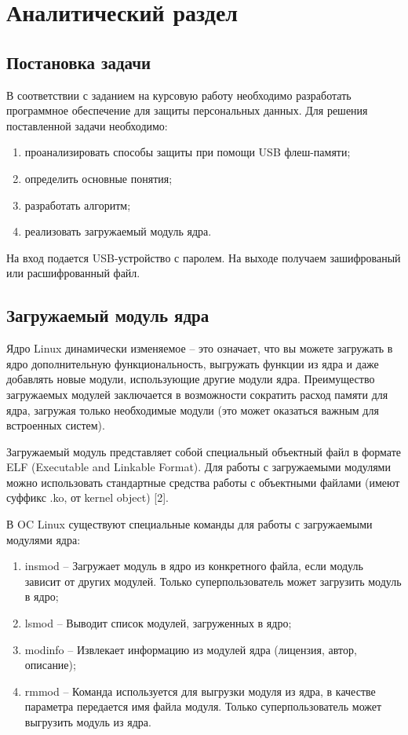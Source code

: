 \documentclass[a4paper, 10pt]{article}
\begin{document}
	
\clearpage
\newpage
\section{Аналитический раздел}
	\subsection{Постановка задачи}
	\hspace*{5mm} В соответствии с заданием на курсовую работу необходимо разработать программное обеспечение для защиты персональных данных. Для решения поставленной задачи необходимо:
	\begin{enumerate}
		\item проанализировать способы защиты при помощи USB флеш-памяти;
		\item определить основные понятия;
		\item разработать алгоритм;
		\item реализовать загружаемый модуль ядра.
	\end{enumerate}
	\hspace*{5mm} На вход подается USB-устройство с паролем. На выходе получаем зашифрованый или расшифрованный файл.
	
	\subsection{Загружаемый модуль ядра}
	\hspace*{5mm} Ядро Linux динамически изменяемое -- это означает, что вы можете загружать в ядро дополнительную функциональность, выгружать функции из ядра и даже добавлять новые модули, использующие другие модули ядра. Преимущество загружаемых модулей заключается в возможности сократить расход памяти для ядра, загружая только необходимые модули (это может оказаться важным для встроенных систем).
	
	Загружаемый модуль представляет собой специальный объектный файл в формате ELF (Executable and Linkable Format). Для работы с загружаемыми модулями можно использовать стандартные средства работы с объектными файлами (имеют суффикс .ko, от kernel object) [2].
	
	
	В OC Linux существуют специальные команды для работы с загружаемыми модулями ядра:
	\begin{enumerate}
		\item insmod -- Загружает модуль в ядро из конкретного файла, если модуль зависит от других модулей. Только суперпользователь может загрузить модуль в ядро;
		\item lsmod -- Выводит список модулей, загруженных в ядро;
		\item modinfo -- Извлекает информацию из модулей ядра (лицензия, автор, описание);
		\item rmmod -- Команда используется для выгрузки модуля из ядра, в качестве параметра передается имя файла модуля. Только суперпользователь может выгрузить модуль из ядра.
	\end{enumerate}
	
\end{document}
